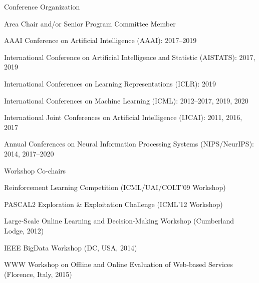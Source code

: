 \documentclass[10pt,twoside,letterpaper]{article}
\newcommand{\negitemspace}{\vspace{1mm}}
\begin{document}
\begin{compactitem}

\item{Conference Organization} \negitemspace

\begin{compactitem}

\item{Area Chair and/or Senior Program Committee Member}

\begin{compactitem}

\item{AAAI Conference on Artificial Intelligence (AAAI): 2017--2019}

\item{International Conference on Artificial Intelligence and Statistic (AISTATS): 2017, 2019}

\item{International Conferences on Learning Representations (ICLR): 2019}

\item{International Conferences on Machine Learning (ICML): 2012--2017, 2019, 2020}

\item{International Joint Conferences on Artificial Intelligence (IJCAI): 2011, 2016, 2017}

\item{Annual Conferences on Neural Information Processing Systems (NIPS/NeurIPS): 2014, 2017--2020}

\end{compactitem}

\item{Workshop Co-chairs}

\begin{compactitem}

\item{Reinforcement Learning Competition
(ICML/UAI/COLT'09 Workshop)}

\item{PASCAL2 Exploration \& Exploitation Challenge (ICML'12 Workshop)}

\item{Large-Scale Online Learning and Decision-Making Workshop (Cumberland Lodge, 2012)}

\item{IEEE BigData Workshop (DC, USA, 2014)}

\item{WWW Workshop on Offline and Online Evaluation of Web-based Services (Florence, Italy, 2015)}


\end{compactitem}
\end{compactitem}
\end{compactitem}
\end{document}
